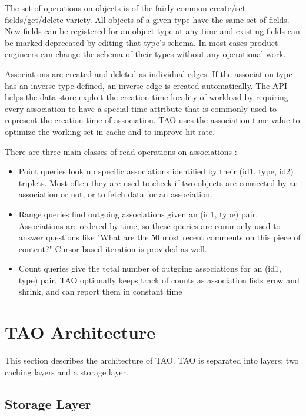 \documentclass[9pt,twocolumn,twoside]{../../styles/osajnl}
\begin{document}
The set of operations on objects is of the fairly common create/set-fields/get/delete variety. All objects of a given type have the same set of fields. New fields can be registered for an object type at any time and existing fields can be marked deprecated by editing that type’s schema. In most cases product engineers can change the schema of their types without any operational work.

Associations are created and deleted as individual edges. If the association type has an inverse type defined, an inverse edge is created automatically. The API helps the data store exploit the creation-time locality of workload by requiring every association to have a special time attribute that is commonly used to represent the creation time of association. TAO uses the association time value to optimize the working set in cache and to improve hit rate.

There are three main classes of read operations on associations \cite{www-tao2}:
\begin{itemize}

\item Point queries look up specific associations identified by their (id1, type, id2) triplets. Most often they are used to check if two objects are connected by an association or not, or to fetch data for an association. 
\item Range queries find outgoing associations given an (id1, type) pair. Associations are ordered by time, so these queries are commonly used to answer questions like "What are the 50 most recent comments on this piece of content?" Cursor-based iteration is provided as well.
\item Count queries give the total number of outgoing associations for an (id1, type) pair. TAO optionally keeps track of counts as association lists grow and shrink, and can report them in constant time
\end{itemize}

\section{TAO Architecture}

This section describes the architecture of TAO. TAO is separated into layers: two caching layers and a storage layer.
\subsection{Storage Layer}
\end{document}
